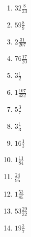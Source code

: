 \documentclass[12pt]{article}
\begin{document}
\begin{enumerate}
\item $ 32 \frac{8}{33} $
\item $ 59 \frac{8}{9} $
\item $ 2 \frac{31}{207} $
\item $ 76 \frac{17}{20} $
\item $ 3 \frac{1}{2} $
\item $ 1 \frac{107}{432} $
\item $ 5 \frac{3}{7} $
\item $ 3 \frac{1}{3} $
\item $ 16 \frac{1}{3} $
\item $ 1 \frac{11}{84} $
\item $ \frac{24}{95} $
\item $ 1 \frac{53}{85} $
\item $ 53 \frac{29}{32} $
\item $ 19 \frac{3}{7} $
\end{enumerate}
\newpage
\end{document}
